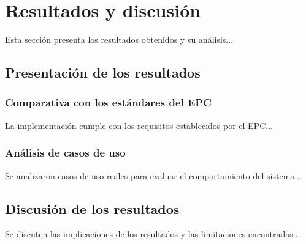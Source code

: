 \chapter{Resultados y discusión}
\label{sec:ResultadosDiscusion}
Esta sección presenta los resultados obtenidos y su análisis...

\section{Presentación de los resultados}
\label{subsec:PresentacionResultados}
\subsection{Comparativa con los estándares del EPC}
\label{subsubsec:ComparativaEPC}
La implementación cumple con los requisitos establecidos por el EPC...

\subsection{Análisis de casos de uso}
\label{subsubsec:AnalisisCasosUso}
Se analizaron casos de uso reales para evaluar el comportamiento del sistema...

\section{Discusión de los resultados}
\label{subsec:DiscusionResultados}
Se discuten las implicaciones de los resultados y las limitaciones encontradas...
